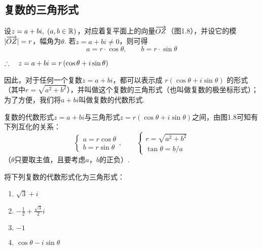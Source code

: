\subsection{复数的三角形式}

设$z=a+bi,\; (a,b\in\mathbb{R})$，对应着复平面上的向量$\overrightarrow{OZ}$（图1.8），并设它的模$|\overrightarrow{OZ}|=r$，幅角为$\theta$. 若$z=a+bi\ne 0$，则可得
\[a=r\cdot \cos\theta,\qquad b=r\cdot \sin\theta\]
\begin{figure}[htp]
    \centering
{}
    \caption{}
\end{figure}


$\therefore\quad z=a+bi=r\left(\cos{\theta}+i\sin{\theta}\right)$

因此，对于任何一个复数$z=a+bi$，都可以表示成
$r(\cos\theta +i\sin\theta)$
的形式（其中$r=\sqrt{a^2+b^2}$），并叫做这个复数的三角形式（也叫做复数的极坐标形式）；为了方便，我们将$a+bi$叫做复数的代数形式.

复数的代数形式$z=a+bi$与三角形式$z=r(\cos\theta +i\sin\theta)$之间，由图1.8可知有下列互化的关系：
\[\begin{cases}
 a=r\cos\theta\\
b=r\sin\theta   
\end{cases},\qquad \begin{cases}
    r=\sqrt{a^2+b^2}\\ \tan\theta=b/a
\end{cases}\]
（$\theta$只要取主值，且要考虑$a$，$b$的正负）.

\begin{example}
 将下列复数的代数形式化为三角形式： 
\begin{multicols}{2}
\begin{enumerate}[(1)]
    \item $\sqrt{3}+i$
    \item $-\frac{1}{2}+\frac{\sqrt{3}}{2}i$
    \item $-1$
    \item $\cos\theta-i\sin\theta$
\end{enumerate}
\end{multicols}  
\end{example}

